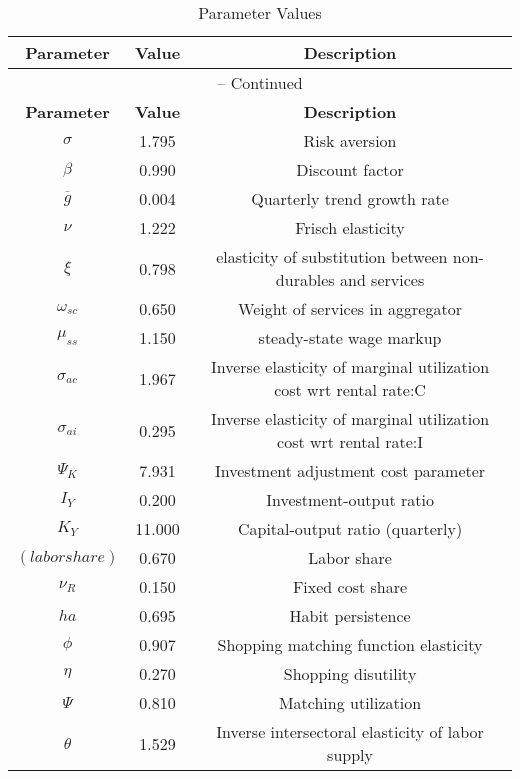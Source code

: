 \begin{center}
\begin{longtable}{ccc}
\caption{Parameter Values}\\%
\toprule%
\multicolumn{1}{c}{\textbf{Parameter}} &
\multicolumn{1}{c}{\textbf{Value}} &
 \multicolumn{1}{c}{\textbf{Description}}\\%
\midrule%
\endfirsthead
\multicolumn{3}{c}{{\tablename} \thetable{} -- Continued}\\%
\midrule%
\multicolumn{1}{c}{\textbf{Parameter}} &
\multicolumn{1}{c}{\textbf{Value}} &
  \multicolumn{1}{c}{\textbf{Description}}\\%
\midrule%
\endhead
${\sigma}$ 	 & 	 1.795 	 & 	 Risk aversion\\
${\beta}$ 	 & 	 0.990 	 & 	 Discount factor\\
${\overline{g}}$ 	 & 	 0.004 	 & 	 Quarterly trend growth rate\\
$\nu$ 	 & 	 1.222 	 & 	 Frisch elasticity\\
$\xi$ 	 & 	 0.798 	 & 	 elasticity of substitution between non-durables and services\\
$\omega_{sc}$ 	 & 	 0.650 	 & 	 Weight of services in aggregator\\
$\mu_{ss}$ 	 & 	 1.150 	 & 	 steady-state wage markup\\
${\sigma_{ac}}$ 	 & 	 1.967 	 & 	 Inverse elasticity of marginal utilization cost wrt rental rate:C\\
${\sigma_{ai}}$ 	 & 	 0.295 	 & 	 Inverse elasticity of marginal utilization cost wrt rental rate:I\\
${\Psi_{K}}$ 	 & 	 7.931 	 & 	 Investment adjustment cost parameter\\
${I_Y}$ 	 & 	 0.200 	 & 	 Investment-output ratio\\
${K_Y}$ 	 & 	 11.000 	 & 	 Capital-output ratio (quarterly)\\
$(labor share)$ 	 & 	 0.670 	 & 	 Labor share\\
${\nu_R}$ 	 & 	 0.150 	 & 	 Fixed cost share\\
${ha}$ 	 & 	 0.695 	 & 	 Habit persistence\\
${\phi}$ 	 & 	 0.907 	 & 	 Shopping matching function elasticity\\
${\eta}$ 	 & 	 0.270 	 & 	 Shopping disutility\\
${\Psi}$ 	 & 	 0.810 	 & 	 Matching utilization\\
${\theta}$ 	 & 	 1.529 	 & 	 Inverse intersectoral elasticity of labor supply\\

\end{longtable}
\end{center}
